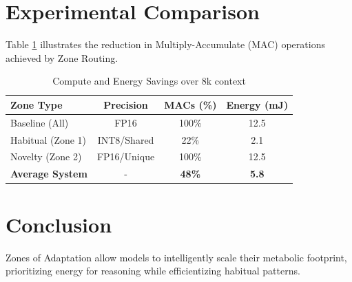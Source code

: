 \documentclass[10pt,twocolumn,letterpaper]{article}
\begin{document}
\begin{algorithm}[h!]
\DontPrintSemicolon
\SetAlgoLined
{}
\caption{Dynamic Zone Routing}
\end{algorithm}

\section{Experimental Comparison}
Table \ref{tab:ops} illustrates the reduction in Multiply-Accumulate (MAC) operations achieved by Zone Routing.

\begin{table}[h!]
\centering
\begin{tabular}{@{}lccc@{}}
\toprule
\textbf{Zone Type} & \textbf{Precision} & \textbf{MACs (\%)} & \textbf{Energy (mJ)} \\ \midrule
Baseline (All) & FP16 & 100\% & 12.5 \\
Habitual (Zone 1) & INT8/Shared & 22\% & 2.1 \\
Novelty (Zone 2) & FP16/Unique & 100\% & 12.5 \\
\textbf{Average System} & - & \textbf{48\%} & \textbf{5.8} \\ 
\bottomrule
\end{tabular}
\caption{Compute and Energy Savings over 8k context}
\label{tab:ops}
\end{table}

\section{Conclusion}
Zones of Adaptation allow models to intelligently scale their metabolic footprint, prioritizing energy for reasoning while efficientizing habitual patterns.
\end{document}
